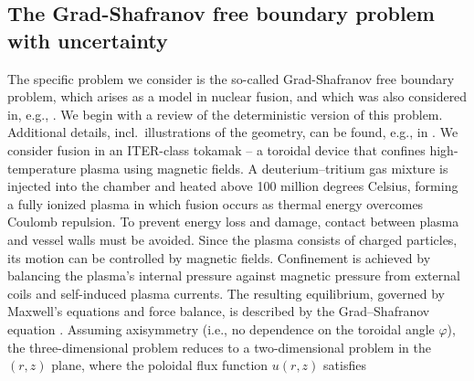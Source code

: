 \subsection{The Grad-Shafranov free boundary problem with uncertainty}\label{sec:Grad-Shafranov}
The specific problem we consider is the so-called Grad-Shafranov free boundary problem, which arises as a model in nuclear fusion, 
and which was also considered in, e.g., \cite{HCElman_JLiang_TSanchez-Vizuet_2022a}.
We begin with a review of the deterministic version of this problem. Additional details, incl.\ illustrations of the geometry, can be found, e.g., in \cite{HCElman_JLiang_TSanchez-Vizuet_2022a}.
We consider fusion in an ITER-class tokamak -- a toroidal device that confines high-temperature plasma using magnetic fields. 
A deuterium–tritium gas mixture is injected into the chamber and heated above 100 million degrees Celsius, forming a fully ionized plasma in which fusion occurs as thermal energy overcomes Coulomb repulsion. To prevent energy loss and damage, contact between plasma and vessel walls must be avoided. Since the plasma consists of charged particles, its motion can be controlled by magnetic fields. Confinement is achieved by balancing the plasma’s internal pressure against magnetic pressure from external coils and self-induced plasma currents. The resulting equilibrium, governed by Maxwell’s equations and force balance, is described by the Grad–Shafranov equation \cite{GrRu:1958, LuSc:1957, Shafranov:1958}. Assuming axisymmetry (i.e., no dependence on the toroidal angle $\varphi$), the three-dimensional problem reduces to a two-dimensional problem in the $(r, z)$ plane, where the poloidal flux function $u(r,z)$ satisfies
%
